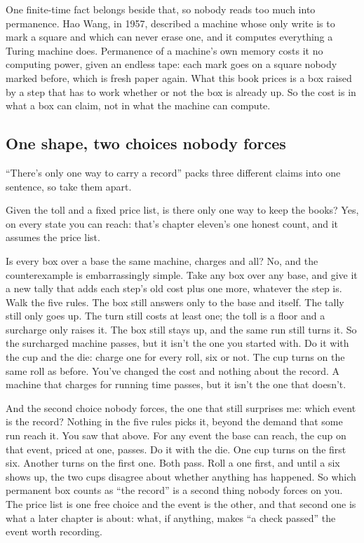 \documentclass[11pt,twoside]{article}
\theoremstyle{thielethm}
\theoremstyle{thieledef}
\theoremstyle{thieledef}
\theoremstyle{thieledef}
\theoremstyle{thielethm}
\theoremstyle{thieleobs}
\theoremstyle{thielethm}
\begin{document}
One finite-time fact belongs beside that, so nobody reads too much into permanence. Hao Wang, in 1957, described a machine whose only write is to mark a square and which can never erase one, and it computes everything a Turing machine does. Permanence of a machine's own memory costs it no computing power, given an endless tape: each mark goes on a square nobody marked before, which is fresh paper again. What this book prices is a box raised by a step that has to work whether or not the box is already up. So the cost is in what a box can claim, not in what the machine can compute.

\subsection{One shape, two choices nobody forces}

``There's only one way to carry a record'' packs three different claims into one sentence, so take them apart.

Given the toll and a fixed price list, is there only one way to keep the books? Yes, on every state you can reach: that's chapter eleven's one honest count, and it assumes the price list.

Is every box over a base the same machine, charges and all? No, and the counterexample is embarrassingly simple. Take any box over any base, and give it a new tally that adds each step's old cost plus one more, whatever the step is. Walk the five rules. The box still answers only to the base and itself. The tally still only goes up. The turn still costs at least one; the toll is a floor and a surcharge only raises it. The box still stays up, and the same run still turns it. So the surcharged machine passes, but it isn't the one you started with. Do it with the cup and the die: charge one for every roll, six or not. The cup turns on the same roll as before. You've changed the cost and nothing about the record. A machine that charges for running time passes, but it isn't the one that doesn't.

And the second choice nobody forces, the one that still surprises me: which event is the record? Nothing in the five rules picks it, beyond the demand that some run reach it. You saw that above. For any event the base can reach, the cup on that event, priced at one, passes. Do it with the die. One cup turns on the first six. Another turns on the first one. Both pass. Roll a one first, and until a six shows up, the two cups disagree about whether anything has happened. So which permanent box counts as ``the record'' is a second thing nobody forces on you. The price list is one free choice and the event is the other, and that second one is what a later chapter is about: what, if anything, makes ``a check passed'' the event worth recording.
\end{document}
